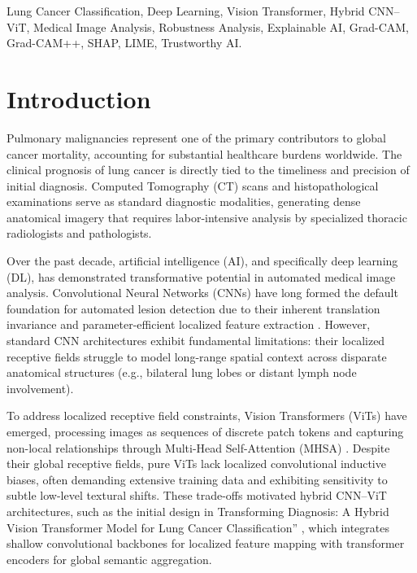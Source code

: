 \documentclass[conference]{IEEEtran}
\begin{document}
\begin{IEEEkeywords}
Lung Cancer Classification, Deep Learning, Vision Transformer, Hybrid CNN--ViT, Medical Image Analysis, Robustness Analysis, Explainable AI, Grad-CAM, Grad-CAM++, SHAP, LIME, Trustworthy AI.
\end{IEEEkeywords}

\section{Introduction}
\label{sec:introduction}

Pulmonary malignancies represent one of the primary contributors to global cancer mortality, accounting for substantial healthcare burdens worldwide. The clinical prognosis of lung cancer is directly tied to the timeliness and precision of initial diagnosis. Computed Tomography (CT) scans and histopathological examinations serve as standard diagnostic modalities, generating dense anatomical imagery that requires labor-intensive analysis by specialized thoracic radiologists and pathologists.

Over the past decade, artificial intelligence (AI), and specifically deep learning (DL), has demonstrated transformative potential in automated medical image analysis. Convolutional Neural Networks (CNNs) have long formed the default foundation for automated lesion detection due to their inherent translation invariance and parameter-efficient localized feature extraction \cite{he2016deep}. However, standard CNN architectures exhibit fundamental limitations: their localized receptive fields struggle to model long-range spatial context across disparate anatomical structures (e.g., bilateral lung lobes or distant lymph node involvement).

To address localized receptive field constraints, Vision Transformers (ViTs) \cite{dosovitskiy2020image} have emerged, processing images as sequences of discrete patch tokens and capturing non-local relationships through Multi-Head Self-Attention (MHSA) \cite{vaswani2017attention}. Despite their global receptive fields, pure ViTs lack localized convolutional inductive biases, often demanding extensive training data and exhibiting sensitivity to subtle low-level textural shifts. These trade-offs motivated hybrid CNN--ViT architectures, such as the initial design in Transforming Diagnosis: A Hybrid Vision Transformer Model for Lung Cancer Classification'' \cite{ORIGINAL_PROJECT_REF}, which integrates shallow convolutional backbones for localized feature mapping with transformer encoders for global semantic aggregation.
\end{document}
